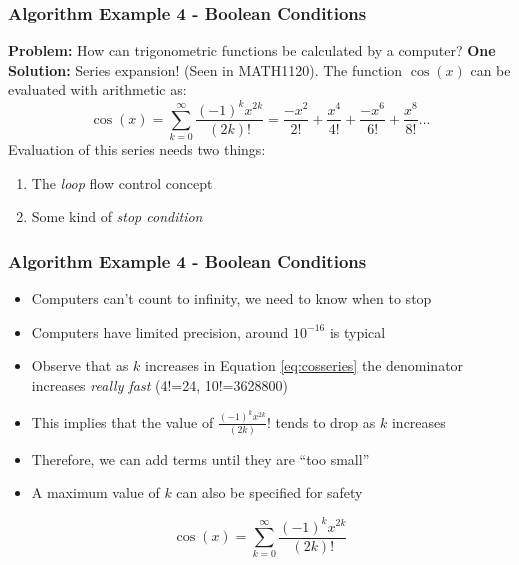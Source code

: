 \documentclass[14pt]{beamer}
\begin{document}
\begin{frame}
\frametitle{Algorithm Example 4 - Boolean Conditions}
{\small
\textbf{Problem:} How can trigonometric functions be calculated by a computer?
\linebreak \linebreak
\textbf{One Solution:} Series expansion! (Seen in MATH1120).
\linebreak \linebreak
The function $\cos (x)$ can be evaluated with arithmetic as:
\begin{equation}
\cos (x) = \sum_{k=0}^{\infty} \frac{(-1)^k x^{2k}}{(2k)!} = \frac{-x^{2}}{2!} + \frac{x^{4}}{4!} + \frac{-x^6}{6!} + \frac{x^8}{8!} ...
\end{equation}
Evaluation of this series needs two things:
\begin{enumerate}
\item The \textit{loop} flow control concept
\item Some kind of \textit{stop condition}
\end{enumerate}
}
\end{frame}
\begin{frame}
\frametitle{Algorithm Example 4 - Boolean Conditions}
{\small
\begin{itemize}
\setlength{\itemsep}{1pt}
  \setlength{\parskip}{0pt}
  \setlength{\parsep}{0pt}
	\item Computers can't count to infinity, we need to know when to stop
	\item Computers have limited precision, around $10^{-16}$ is typical
	\item Observe that as $k$ increases in Equation \ref{eq:cosseries} the denominator increases \textit{really fast} (4!=24, 10!=3628800)
	\item This implies that the value of $\frac{(-1)^k x^{2k}}{(2k)}!$ tends to drop as $k$ increases
	\item Therefore, we can add terms until they are ``too small''
	\item A maximum value of $k$ can also be specified for safety 
\end{itemize}
\vspace{-3mm}
\begin{equation} \label{eq:cosseries}
\cos (x) = \sum_{k=0}^{\infty} \frac{(-1)^k x^{2k}}{(2k)!}
\end{equation}
}
\end{frame}
\end{document}
